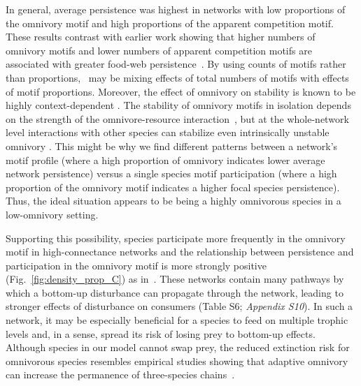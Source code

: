 \documentclass[12pt]{article}
\begin{document}
\begin{spacing}{2.0}
    
    In general, average persistence was highest in networks with low proportions of the omnivory motif and high proportions of the apparent competition motif. 
    These results contrast with earlier work showing that higher numbers of omnivory motifs and lower numbers of apparent competition motifs are associated with greater food-web persistence~\citep{Stouffer2010b}.
    By using counts of motifs rather than proportions,~\citet{Stouffer2010b} may be mixing effects of total numbers of motifs with effects of motif proportions.
    Moreover, the effect of omnivory on stability is known to be highly context-dependent \citep{bascompte2005simple, Monteiro2016,McLeod2021}. 
    The stability of omnivory motifs in isolation depends on the strength of the omnivore-resource interaction~\citep{McLeod2021}, but at the whole-network level interactions with other species can stabilize even intrinsically unstable omnivory \citep{Kratina2012}. 
    This might be why we find different patterns between a network's motif profile (where a high proportion of omnivory indicates lower average network persistence) versus a single species motif participation (where a high proportion of the omnivory motif indicates a higher focal species persistence).
    Thus, the ideal situation appears to be being a highly omnivorous species in a low-omnivory setting. 
    
    Supporting this possibility, species participate more frequently in the omnivory motif in high-connectance networks and the relationship between persistence and participation in the omnivory motif is more strongly positive (Fig.~\ref{fig:density_prop_C}) as in~\citet{McLeod2021}.
    These networks contain many pathways by which a bottom-up disturbance can propagate through the network, leading to stronger effects of disturbance on consumers (Table S6; \emph{Appendix S10}).
    In such a network, it may be especially beneficial for a species to feed on multiple trophic levels and, in a sense, spread its risk of losing prey to bottom-up effects.
    Although species in our model cannot swap prey, the reduced extinction risk for omnivorous species resembles empirical studies showing that adaptive omnivory can increase the permanence of three-species chains~\citep{Fagan1997, Kvrivan2005, AbramsFung2010}.
    

\end{spacing}
\end{document}
